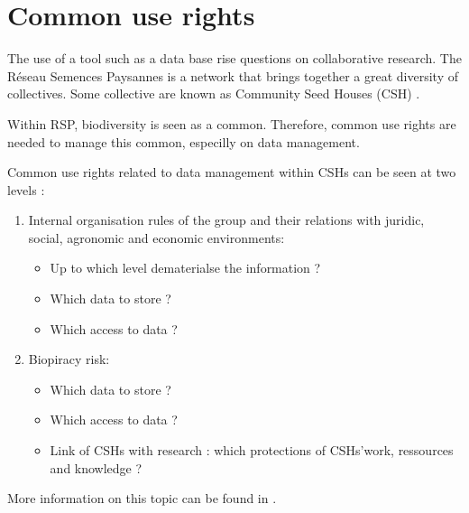 \section{Common use rights}

The use of a tool such as a data base rise questions on collaborative research.
The R\'eseau Semences Paysannes is a network that brings together a great diversity of collectives.
Some collective are known as Community Seed Houses (CSH) \citep{rsp_msp_2014}.

Within RSP, biodiversity is seen as a common.
Therefore, common use rights are needed to manage this common, especilly on data management.

Common use rights related to data management within CSHs can be seen at two levels :

\begin{enumerate}

\item Internal organisation rules of the group and their relations with juridic, social, agronomic and economic environments:
	\begin{itemize}
	\item Up to which level dematerialse the information ?
	\item Which data to store ?
	\item Which access to data ?
	\end{itemize}

\item Biopiracy risk:
	\begin{itemize}
	\item Which data to store ?
	\item Which access to data ?
	\item Link of CSHs with research : which protections of CSHs'work, ressources and knowledge ?
	\end{itemize}

\end{enumerate}

More information on this topic can be found in \citet{rsp_element_2015}.




